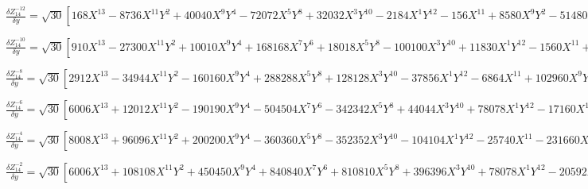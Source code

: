 \documentclass[10pt,landscape]{article}
\begin{document}
\vspace{1.2 mm}
\noindent $ \frac{\delta Z^{-12}_{14}}{\delta y} = \sqrt{30} [168X^{13} -8736X^{11}Y^{2} +40040X^{9}Y^{4} -72072X^{5}Y^{8} +32032X^{3}Y^{10} -2184X^{1}Y^{12} -156X^{11} +8580X^{9}Y^{2} -51480X^{7}Y^{4} +72072X^{5}Y^{6} -25740X^{3}Y^{8} +1716X^{1}Y^{10}] $

\vspace{1.2 mm}
\noindent $ \frac{\delta Z^{-10}_{14}}{\delta y} = \sqrt{30} [910X^{13} -27300X^{11}Y^{2} +10010X^{9}Y^{4} +168168X^{7}Y^{6} +18018X^{5}Y^{8} -100100X^{3}Y^{10} +11830X^{1}Y^{12} -1560X^{11} +51480X^{9}Y^{2} -102960X^{7}Y^{4} -144144X^{5}Y^{6} +154440X^{3}Y^{8} -17160X^{1}Y^{10} +660X^{9} -23760X^{7}Y^{2} +83160X^{5}Y^{4} -55440X^{3}Y^{6} +5940X^{1}Y^{8}] $

\vspace{1.2 mm}
\noindent $ \frac{\delta Z^{-8}_{14}}{\delta y} = \sqrt{30} [2912X^{13} -34944X^{11}Y^{2} -160160X^{9}Y^{4} +288288X^{5}Y^{8} +128128X^{3}Y^{10} -37856X^{1}Y^{12} -6864X^{11} +102960X^{9}Y^{2} +205920X^{7}Y^{4} -288288X^{5}Y^{6} -308880X^{3}Y^{8} +75504X^{1}Y^{10} +5280X^{9} -95040X^{7}Y^{2} +221760X^{3}Y^{6} -47520X^{1}Y^{8} -1320X^{7} +27720X^{5}Y^{2} -46200X^{3}Y^{4} +9240X^{1}Y^{6}] $

\vspace{1.2 mm}
\noindent $ \frac{\delta Z^{-6}_{14}}{\delta y} = \sqrt{30} [6006X^{13} +12012X^{11}Y^{2} -190190X^{9}Y^{4} -504504X^{7}Y^{6} -342342X^{5}Y^{8} +44044X^{3}Y^{10} +78078X^{1}Y^{12} -17160X^{11} +17160X^{9}Y^{2} +514800X^{7}Y^{4} +720720X^{5}Y^{6} +51480X^{3}Y^{8} -188760X^{1}Y^{10} +17820X^{9} -71280X^{7}Y^{2} -415800X^{5}Y^{4} -166320X^{3}Y^{6} +160380X^{1}Y^{8} -7920X^{7} +55440X^{5}Y^{2} +92400X^{3}Y^{4} -55440X^{1}Y^{6} +1260X^{5} -12600X^{3}Y^{2} +6300X^{1}Y^{4}] $

\vspace{1.2 mm}
\noindent $ \frac{\delta Z^{-4}_{14}}{\delta y} = \sqrt{30} [8008X^{13} +96096X^{11}Y^{2} +200200X^{9}Y^{4} -360360X^{5}Y^{8} -352352X^{3}Y^{10} -104104X^{1}Y^{12} -25740X^{11} -231660X^{9}Y^{2} -257400X^{7}Y^{4} +360360X^{5}Y^{6} +694980X^{3}Y^{8} +283140X^{1}Y^{10} +31680X^{9} +190080X^{7}Y^{2} -443520X^{3}Y^{6} -285120X^{1}Y^{8} -18480X^{7} -55440X^{5}Y^{2} +92400X^{3}Y^{4} +129360X^{1}Y^{6} +5040X^{5} -25200X^{1}Y^{4} -504X^{3} +1512X^{1}Y^{2}] $

\vspace{1.2 mm}
\noindent $ \frac{\delta Z^{-2}_{14}}{\delta y} = \sqrt{30} [6006X^{13} +108108X^{11}Y^{2} +450450X^{9}Y^{4} +840840X^{7}Y^{6} +810810X^{5}Y^{8} +396396X^{3}Y^{10} +78078X^{1}Y^{12} -20592X^{11} -308880X^{9}Y^{2} -1029600X^{7}Y^{4} -1441440X^{5}Y^{6} -926640X^{3}Y^{8} -226512X^{1}Y^{10} +27720X^{9} +332640X^{7}Y^{2} +831600X^{5}Y^{4} +776160X^{3}Y^{6} +249480X^{1}Y^{8} -18480X^{7} -166320X^{5}Y^{2} -277200X^{3}Y^{4} -129360X^{1}Y^{6} +6300X^{5} +37800X^{3}Y^{2} +31500X^{1}Y^{4} -1008X^{3} -3024X^{1}Y^{2} +56X^{1}] $
\end{document}
